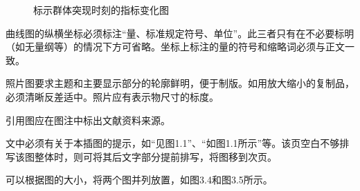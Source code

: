 \begin{figure}[htbp]
	\centering
	\quad  %
	\centering
	\caption{标示群体突现时刻的指标变化图}
	\label{fig:3.3}
\end{figure}

曲线图的纵横坐标必须标注“量、标准规定符号、单位”。此三者只有在不必要标明（如无量纲等）的情况下方可省略。坐标上标注的量的符号和缩略词必须与正文一致。

照片图要求主题和主要显示部分的轮廓鲜明，便于制版。如用放大缩小的复制品，必须清晰反差适中。照片应有表示物尺寸的标度。

引用图应在图注中标出文献资料来源。

文中必须有关于本插图的提示，如“见图1.1”、“如图1.1所示”等。该页空白不够排写该图整体时，则可将其后文字部分提前排写，将图移到次页。

可以根据图的大小，将两个图并列放置，如图3.4和图3.5所示。


